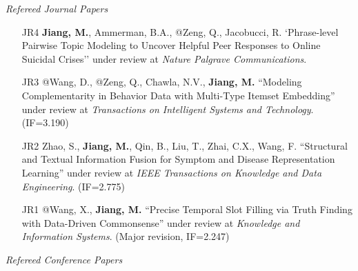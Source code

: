 \documentclass[10pt]{article}
\newenvironment{myindentpar}[1]%
{\begin{list}{}%
         {\setlength{\leftmargin}{#1}}%
         \item[]%
}
{\end{list}}
\newcounter{list}
\begin{document}
\begin{myindentpar}{0.00cm}

\hspace{-0.25cm}\emph{Refereed Journal Papers}

\begin{enumerate}[leftmargin=.5cm]


\item[JR4] \textbf{Jiang, M.}, Ammerman, B.A., @Zeng, Q., Jacobucci, R. `Phrase-level Pairwise Topic Modeling to Uncover Helpful Peer Responses to Online Suicidal Crises'' under review at \textit{Nature Palgrave Communications}.
		
\item[JR3] @Wang, D., @Zeng, Q., Chawla, N.V., \textbf{Jiang, M.} ``Modeling Complementarity in Behavior Data with Multi-Type Itemset Embedding'' under review at \textit{Transactions on Intelligent Systems and Technology}. (IF=3.190)

\item[JR2] Zhao, S., \textbf{Jiang, M.}, Qin, B., Liu, T., Zhai, C.X., Wang, F. ``Structural and Textual Information Fusion for Symptom and Disease Representation Learning'' under review at \textit{IEEE Transactions on Knowledge and Data Engineering}. (IF=2.775)

\item[JR1] @Wang, X., \textbf{Jiang, M.} ``Precise Temporal Slot Filling via Truth Finding with Data-Driven Commonsense'' under review at \textit{Knowledge and Information Systems}. (Major revision, IF=2.247)
	
\end{enumerate}

\vspace{.2cm}\hspace{-0.25cm}\emph{Refereed Conference Papers}

\begin{enumerate}[leftmargin=.5cm]




\end{enumerate}
\end{myindentpar}
\end{document}
